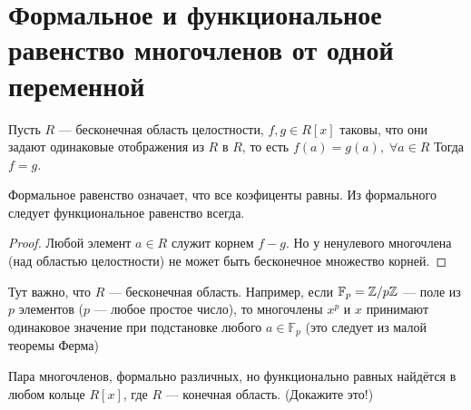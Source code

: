 
\section{Формальное и функциональное равенство многочленов от одной переменной}
\begin{normalsize}
\begin{theorem-non}
    Пусть $R$ --- бесконечная область целостности, $f,g \in R[x]$ таковы,
    что они задают одинаковые отображения из $R$ в $R$, то есть
    $f(a) = g(a),\; \forall a \in R$
    Тогда $f = g$. 
\end{theorem-non}
Формальное равенство означает, что все коэфиценты равны.
Из формального следует функциональное равенство всегда.
\begin{proof}
    Любой элемент $a \in R$ служит корнем $f - g$.
    Но у ненулевого многочлена (над областью целостности) не может
    быть бесконечное множество корней. 
\end{proof}

\notice 
Тут важно, что $R$ --- бесконечная область. Например, если
$\mathbb{F}_p = \mathbb{Z} /p\mathbb{Z}$ --- поле из $p$ элементов ($p$ --- любое простое число), то
многочлены $x^p$ и $x$ принимают одинаковое значение при подстановке любого $a \in \mathbb{F}_p$ (это следует из малой теоремы Ферма)

Пара многочленов, формально различных, но функционально равных найдётся в любом кольце $R[x]$, где $R$ --- конечная область. (Докажите это!)
\end{normalsize}